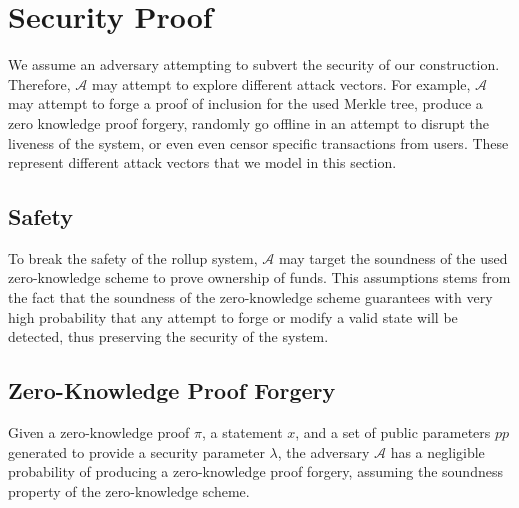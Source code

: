 \section{Security Proof}

We assume an adversary attempting to subvert the security of our construction. Therefore, $\mathcal{A}$ may attempt to explore different attack vectors. For example, $\mathcal{A}$ may attempt to forge a proof of inclusion for the used Merkle tree, produce a zero knowledge proof forgery, randomly go offline in an attempt to disrupt the liveness of the system, or even even censor specific transactions from users. These represent different attack vectors that we model in this section.

\subsection{Safety}

To break the safety of the rollup system, $\mathcal{A}$ may target the soundness of the used zero-knowledge scheme to prove ownership of funds. This assumptions stems from the fact that the soundness of the zero-knowledge scheme guarantees with very high probability that any attempt to forge or modify a valid state will be detected, thus preserving the security of the system. 

\subsection*{Zero-Knowledge Proof Forgery}

\begin{theorem}
Given a zero-knowledge proof $\pi$, a statement $x$, and a set of public parameters $pp$ generated to provide a security parameter $\lambda$, the adversary $\mathcal{A}$ has a negligible probability of producing a zero-knowledge proof forgery, assuming the soundness property of the zero-knowledge scheme.
\end{theorem}

